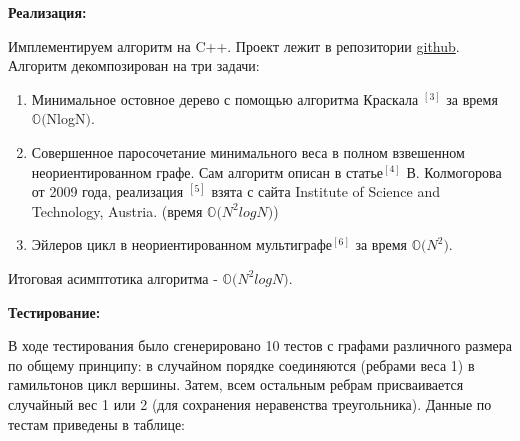 \documentclass[A4, twocolumn]{article}
\begin{document}
\begin{center}
	\textbf{\large Реализация:}
\end{center}

Имплементируем алгоритм на C++. Проект лежит в репозитории \href{https://github.com/JerryCh0/complexity/tree/master/Christofides/Christofides}{github}.
Алгоритм декомпозирован на три задачи:
\begin{enumerate}
	\item Минимальное остовное дерево с помощью алгоритма Краскала \hyperref[Kruskal]{$^{[3]}$} за время $\mathbb{O(}$NlogN$)$. 
	\item Совершенное паросочетание минимального веса в полном взвешенном неориентированном графе. Сам алгоритм описан в статье\hyperref[kolm]{$^{[4]}$} В. Колмогорова от 2009 года, реализация \hyperref[realisation]{$^{[5]}$} взята с сайта Institute of Science and Technology, Austria. (время $\mathbb{O(}N^2logN)$)
	\item Эйлеров цикл в неориентированном мультиграфе\hyperref[euler]{$^{[6]}$} за время $\mathbb{O(}N^2)$.
\end{enumerate}

Итоговая асимптотика алгоритма - $\mathbb{O(}N^2logN)$.

\begin{center}
	\textbf{\large Тестирование:}
\end{center} 

В ходе тестирования было сгенерировано 10 тестов с графами различного размера по общему принципу: в случайном порядке соединяются (ребрами веса 1) в гамильтонов цикл вершины. Затем, всем остальным ребрам присваивается случайный вес 1 или 2 (для сохранения неравенства треугольника). Данные по тестам приведены в таблице:

$                  $
\end{document}
